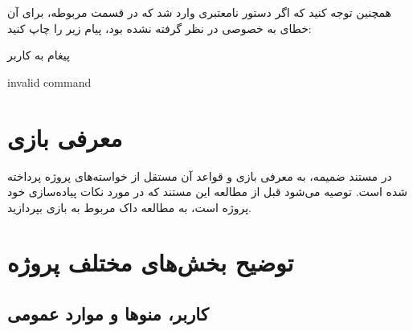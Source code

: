 \documentclass[]{article}
\begin{document}
\begin{enumerate}[label={نکته \arabic*:}]
همچنین توجه کنید که اگر دستور نامعتبری وارد شد که در قسمت مربوطه، برای آن خطای به خصوصی در نظر گرفته نشده بود، پیام زیر را چاپ کنید:

\begin{mybox}[colback=yellow]{پیغام به کاربر}
	
	
	\begin{latin}
		
	invalid command
		
	\end{latin}
	
\end{mybox}


\end{enumerate}




\newpage


\section*{{\titr معرفی بازی}}

در مستند ضمیمه، به معرفی بازی و قواعد آن مستقل از خواسته‌های پروژه پرداخته شده است. توصیه می‌شود قبل از مطالعه این مستند که در مورد نکات پیاده‌سازی خود پروژه است، به مطالعه داک مربوط به بازی بپردازید.





\section*{{\titr توضیح بخش‌های مختلف پروژه}}



\subsection*{{\titr کاربر، منوها و موارد عمومی}}
\end{document}
